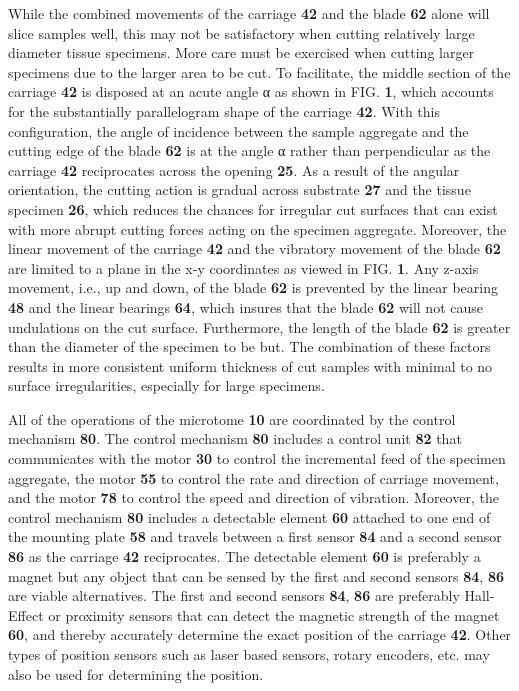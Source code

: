 \documentclass{article}
\begin{document}
While the combined movements of the carriage \textbf{42} and the blade \textbf{62} alone will slice samples well, this may not be satisfactory when cutting relatively large diameter tissue specimens. More care must be exercised when cutting larger specimens due to the larger area to be cut. To facilitate, the middle section of the carriage \textbf{42} is disposed at an acute angle α as shown in FIG. \textbf{1}, which accounts for the substantially parallelogram shape of the carriage \textbf{42}. With this configuration, the angle of incidence between the sample aggregate and the cutting edge of the blade \textbf{62} is at the angle α rather than perpendicular as the carriage \textbf{42} reciprocates across the opening \textbf{25}. As a result of the angular orientation, the cutting action is gradual across substrate \textbf{27} and the tissue specimen \textbf{26}, which reduces the chances for irregular cut surfaces that can exist with more abrupt cutting forces acting on the specimen aggregate. Moreover, the linear movement of the carriage \textbf{42} and the vibratory movement of the blade \textbf{62} are limited to a plane in the x-y coordinates as viewed in FIG. \textbf{1}. Any z-axis movement, i.e., up and down, of the blade \textbf{62} is prevented by the linear bearing \textbf{48} and the linear bearings \textbf{64}, which insures that the blade \textbf{62} will not cause undulations on the cut surface. Furthermore, the length of the blade \textbf{62} is greater than the diameter of the specimen to be but. The combination of these factors results in more consistent uniform thickness of cut samples with minimal to no surface irregularities, especially for large specimens.

All of the operations of the microtome \textbf{10} are coordinated by the control mechanism \textbf{80}. The control mechanism \textbf{80} includes a control unit \textbf{82} that communicates with the motor \textbf{30} to control the incremental feed of the specimen aggregate, the motor \textbf{55} to control the rate and direction of carriage movement, and the motor \textbf{78} to control the speed and direction of vibration. Moreover, the control mechanism \textbf{80} includes a detectable element \textbf{60} attached to one end of the mounting plate \textbf{58} and travels between a first sensor \textbf{84} and a second sensor \textbf{86} as the carriage \textbf{42} reciprocates. The detectable element \textbf{60} is preferably a magnet but any object that can be sensed by the first and second sensors \textbf{84}, \textbf{86} are viable alternatives. The first and second sensors \textbf{84}, \textbf{86} are preferably Hall-Effect or proximity sensors that can detect the magnetic strength of the magnet \textbf{60}, and thereby accurately determine the exact position of the carriage \textbf{42}. Other types of position sensors such as laser based sensors, rotary encoders, etc. may also be used for determining the position.
\end{document}
